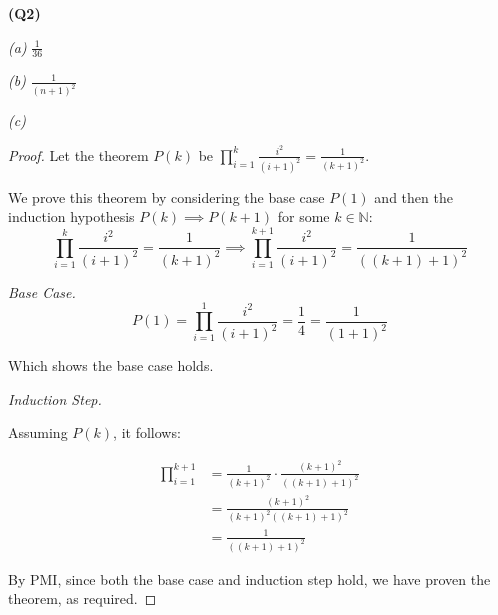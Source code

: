 \documentclass[12pt, a4paper]{article}
\newcommand{\N}{\mathbb{N}}
\begin{document}
\noindent\textbf{(Q2)}

\vspace{5mm}

\noindent\textit{(a)} $\displaystyle{\frac{1}{36}}$

\vspace{5mm}

\noindent\textit{(b)} $\displaystyle{\frac{1}{(n + 1)^2}}$

\vspace{5mm}

\noindent\textit{(c)}

\begin{proof}
    Let the theorem $P(k)$ be $\prod_{i = 1}^k\frac{i^2}{(i + 1)^2} = \frac{1}{(k + 1)^2}$.
    
    We prove this theorem by considering the base case $P(1)$ and then the induction hypothesis
    $P(k) \implies P(k + 1)$ for some $k \in \N$:
    \[
        \prod_{i = 1}^k\frac{i^2}{(i + 1)^2}
        = \frac{1}{(k + 1)^2}
        \implies
        \prod_{i = 1}^{k + 1}\frac{i^2}{(i + 1)^2}
        = \frac{1}{((k + 1) + 1)^2}
    \]

    \noindent\textit{Base Case.}
    \[
        P(1) = \prod_{i = 1}^{1}\frac{i^2}{(i + 1)^2} = \frac{1}{4} = \frac{1}{(1 + 1)^2}
    \]

    Which shows the base case holds.

    \noindent\textit{Induction Step.}

    Assuming $P(k)$, it follows:

    \begin{align*}
        \prod_{i = 1}^{k + 1}  & = \frac{1}{(k + 1)^2} \cdot \frac{(k + 1)^2}{((k + 1) + 1)^2}\\
        & = \frac{(k + 1)^2}{(k + 1)^2((k + 1) + 1)^2}\\
        & = \frac{1}{((k + 1) + 1)^2}
    \end{align*}

    By PMI, since both the base case and induction step hold, we have proven the theorem, as required.

\end{proof}
\end{document}
